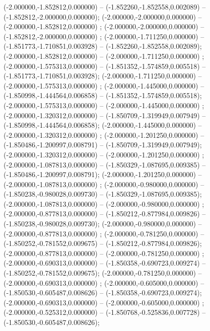 (-2.000000,-1.852812,0.000000) -- (-1.852260,-1.852558,0.002089) -- (-1.852812,-2.000000,0.000000);
 (-2.000000,-2.000000,0.000000) -- (-2.000000,-1.852812,0.000000) ;
 (-2.000000,-2.000000,0.000000) -- (-1.852812,-2.000000,0.000000) ;
 (-2.000000,-1.711250,0.000000) -- (-1.851773,-1.710851,0.003928) -- (-1.852260,-1.852558,0.002089);
 (-2.000000,-1.852812,0.000000) -- (-2.000000,-1.711250,0.000000) ;
 (-2.000000,-1.575313,0.000000) -- (-1.851352,-1.574859,0.005518) -- (-1.851773,-1.710851,0.003928);
 (-2.000000,-1.711250,0.000000) -- (-2.000000,-1.575313,0.000000) ;
 (-2.000000,-1.445000,0.000000) -- (-1.850998,-1.444564,0.006858) -- (-1.851352,-1.574859,0.005518);
 (-2.000000,-1.575313,0.000000) -- (-2.000000,-1.445000,0.000000) ;
 (-2.000000,-1.320312,0.000000) -- (-1.850709,-1.319949,0.007949) -- (-1.850998,-1.444564,0.006858);
 (-2.000000,-1.445000,0.000000) -- (-2.000000,-1.320312,0.000000) ;
 (-2.000000,-1.201250,0.000000) -- (-1.850486,-1.200997,0.008791) -- (-1.850709,-1.319949,0.007949);
 (-2.000000,-1.320312,0.000000) -- (-2.000000,-1.201250,0.000000) ;
 (-2.000000,-1.087813,0.000000) -- (-1.850329,-1.087695,0.009385) -- (-1.850486,-1.200997,0.008791);
 (-2.000000,-1.201250,0.000000) -- (-2.000000,-1.087813,0.000000) ;
 (-2.000000,-0.980000,0.000000) -- (-1.850238,-0.980028,0.009730) -- (-1.850329,-1.087695,0.009385);
 (-2.000000,-1.087813,0.000000) -- (-2.000000,-0.980000,0.000000) ;
 (-2.000000,-0.877813,0.000000) -- (-1.850212,-0.877984,0.009826) -- (-1.850238,-0.980028,0.009730);
 (-2.000000,-0.980000,0.000000) -- (-2.000000,-0.877813,0.000000) ;
 (-2.000000,-0.781250,0.000000) -- (-1.850252,-0.781552,0.009675) -- (-1.850212,-0.877984,0.009826);
 (-2.000000,-0.877813,0.000000) -- (-2.000000,-0.781250,0.000000) ;
 (-2.000000,-0.690313,0.000000) -- (-1.850358,-0.690723,0.009274) -- (-1.850252,-0.781552,0.009675);
 (-2.000000,-0.781250,0.000000) -- (-2.000000,-0.690313,0.000000) ;
 (-2.000000,-0.605000,0.000000) -- (-1.850530,-0.605487,0.008626) -- (-1.850358,-0.690723,0.009274);
 (-2.000000,-0.690313,0.000000) -- (-2.000000,-0.605000,0.000000) ;
 (-2.000000,-0.525312,0.000000) -- (-1.850768,-0.525836,0.007728) -- (-1.850530,-0.605487,0.008626);
